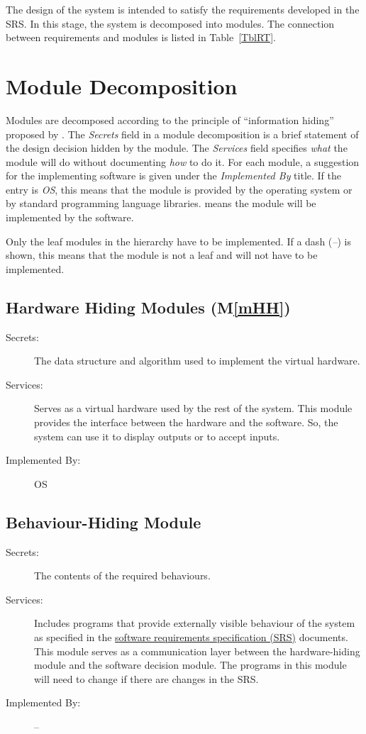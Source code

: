 \documentclass[12pt, titlepage]{article}
\newcommand{\mref}[1]{M\ref{#1}}
\begin{document}
The design of the system is intended to satisfy the requirements developed in
the SRS. In this stage, the system is decomposed into modules. The connection
between requirements and modules is listed in Table~\ref{TblRT}.

\section{Module Decomposition} \label{SecMD}

Modules are decomposed according to the principle of ``information hiding''
proposed by \citet{ParnasEtAl1984}. The \emph{Secrets} field in a module
decomposition is a brief statement of the design decision hidden by the
module. The \emph{Services} field specifies \emph{what} the module will do
without documenting \emph{how} to do it. For each module, a suggestion for the
implementing software is given under the \emph{Implemented By} title. If the
entry is \emph{OS}, this means that the module is provided by the operating
system or by standard programming language libraries.  \emph{\progname{}} means the
module will be implemented by the \progname{} software.

Only the leaf modules in the hierarchy have to be implemented. If a dash
(\emph{--}) is shown, this means that the module is not a leaf and will not have
to be implemented.

\subsection{Hardware Hiding Modules (\mref{mHH})}

\begin{description}
\item[Secrets:]The data structure and algorithm used to implement the virtual
  hardware.
\item[Services:]Serves as a virtual hardware used by the rest of the
  system. This module provides the interface between the hardware and the
  software. So, the system can use it to display outputs or to accept inputs.
\item[Implemented By:] OS
\end{description}

\subsection{Behaviour-Hiding Module}

\begin{description}
\item[Secrets:]The contents of the required behaviours.
\item[Services:]Includes programs that provide externally visible behaviour of
  the system as specified in the \href{https://github.com/WaqarAwan376/Damped_Harmonic_Oscillator-CAS741/tree/main/docs/SRS}{software requirements specification (SRS)}
  documents. This module serves as a communication layer between the
  hardware-hiding module and the software decision module. The programs in this
  module will need to change if there are changes in the SRS.
\item[Implemented By:] --
\end{description}
\end{document}
